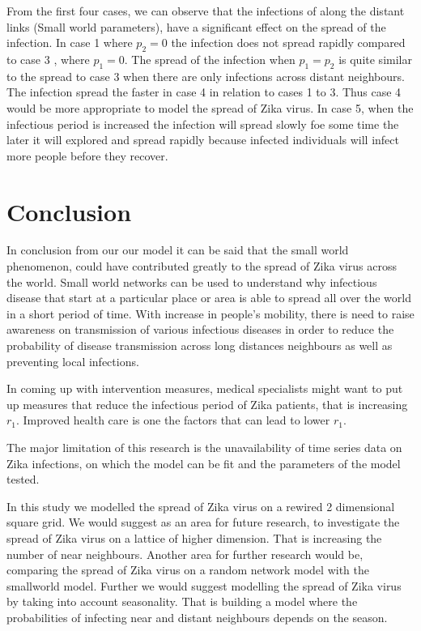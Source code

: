 From the first four cases, we can observe that the infections of along the distant links  (Small world parameters), have a significant effect on the spread of the infection. In case 1 where $p_2 =0$ the infection does not spread rapidly compared to case 3 , where $p_1 =0$. The spread of the infection when $p_1 =p_2$ is quite similar to the spread to case 3 when there are only infections across distant neighbours. The infection spread the faster in case 4 in relation to cases 1 to 3. Thus case 4 would be more appropriate to model the spread of Zika virus. In case 5, when the infectious period is increased the infection will spread slowly foe some time the later it will explored and spread rapidly because infected individuals will infect more people before they recover.

\section{Conclusion}

In conclusion from our our model it can be said that the small world phenomenon, could have  contributed  greatly to the spread of Zika virus across the world. Small world networks can be used to understand why infectious disease that start at a particular place or area is able to spread all over the world in a short period of time. With increase in people's mobility, there is need to raise awareness on transmission of various infectious diseases in order to reduce the probability of disease transmission across long distances
neighbours as well as preventing local infections. 

In coming up with intervention measures, medical specialists might want  to put up measures that reduce the infectious period of Zika patients, that is increasing $r_1$.  Improved health care is one the factors that can lead to lower $r_1$. 

The major limitation of this research is the unavailability of time series data on Zika infections, on which the model can be fit and the parameters of the model tested.

In this study we modelled the spread of Zika virus on a rewired 2 dimensional square grid. We would suggest as an area for future research, to investigate the spread of Zika virus on a lattice of higher dimension. That is increasing the number of near neighbours. Another area for further research would be, comparing the spread of Zika virus on a random network model with the smallworld model. Further we would suggest modelling the spread of Zika virus by taking into account seasonality. That is building a model where the probabilities of infecting near and distant neighbours depends on the season.
